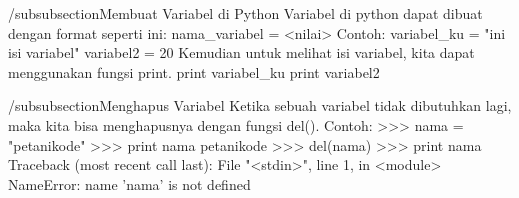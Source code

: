 /subsubsection{Membuat Variabel di Python}
Variabel di python dapat dibuat dengan format seperti ini:
nama_variabel = <nilai>
Contoh:
variabel_ku = "ini isi variabel"
variabel2 = 20
Kemudian untuk melihat isi variabel, kita dapat menggunakan fungsi print.
print variabel_ku
print variabel2

/subsubsection{Menghapus Variabel}
Ketika sebuah variabel tidak dibutuhkan lagi, maka kita bisa menghapusnya dengan fungsi del().
Contoh:
>>> nama = "petanikode"
>>> print nama
petanikode
>>> del(nama)
>>> print nama
Traceback (most recent call last):
  File "<stdin>", line 1, in <module>
NameError: name 'nama' is not defined
